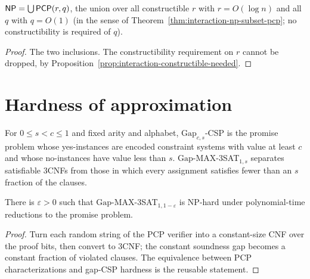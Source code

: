 \begin{theorem}
  \label{thm:interaction-pcp-theorem}
  \leanok
  $\mathsf{NP} = \bigcup \mathsf{PCP}(r, q)$, the union over all constructible $r$
  with $r = O(\log n)$ and all $q$ with $q = O(1)$ (in the sense of
  Theorem~\ref{thm:interaction-np-subset-pcp}; no constructibility is
  required of $q$).
\end{theorem}
\begin{proof}
  \leanok
  The two inclusions. The constructibility requirement on $r$ cannot be
  dropped, by
  Proposition~\ref{prop:interaction-constructible-needed}.
\end{proof}

\section{Hardness of approximation}

\begin{definition}
  \label{def:interaction-gap-csp}
  For $0 \le s < c \le 1$ and fixed arity and alphabet, $\mathrm{Gap}_{c,s}$-CSP
  is the promise problem whose yes-instances are encoded constraint systems
  with value at least $c$ and whose no-instances have value less than $s$.
  $\mathrm{Gap}$-MAX-3SAT$_{1,s}$ separates satisfiable 3CNFs from those in
  which every assignment satisfies fewer than an $s$ fraction of the clauses.
\end{definition}

\begin{theorem}
  \label{thm:interaction-gap-max3sat}
  \notready
  There is $\varepsilon > 0$ such that $\mathrm{Gap}$-MAX-3SAT$_{1, 1 -
  \varepsilon}$ is NP-hard under polynomial-time reductions to the promise
  problem.
\end{theorem}
\begin{proof}
  Turn each random string of the PCP verifier into a constant-size CNF over the
  proof bits, then convert to 3CNF; the constant soundness gap becomes a
  constant fraction of violated clauses. The equivalence between PCP
  characterizations and gap-CSP hardness is the reusable statement.
\end{proof}


